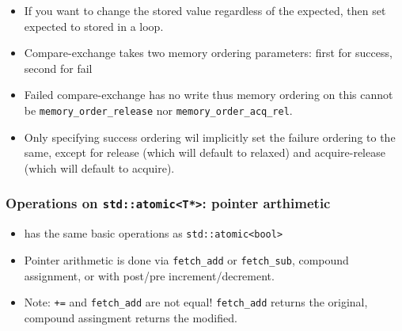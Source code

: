 \documentclass[11pt, a4paper]{article}
\theoremstyle{definition}
\theoremstyle{remark}
\newcommand{\code}[1]{\lstinline|#1|}
\begin{document}
\begin{itemize}
    \item If you want to change the stored value regardless of the expected, then set expected to stored in a loop. 
    \item Compare-exchange takes two memory ordering parameters: first for success, second for fail 
    \item Failed compare-exchange has no write thus memory ordering on this cannot be \code{memory_order_release} nor \code{memory_order_acq_rel}.
    \item Only specifying success ordering wil implicitly set the failure ordering to the same, except for release (which will default to relaxed) and acquire-release (which will default to acquire).
\end{itemize}
\subsubsection{Operations on \texorpdfstring{\code{std::atomic<T*>}}{std::atomic<T*>}: pointer arthimetic}
\begin {itemize}
    \item has the same basic operations as \code{std::atomic<bool>}
    \item Pointer arithmetic is done via \code{fetch_add} or \code{fetch_sub}, compound assignment, or with post/pre increment/decrement.
    \item Note: \code{+=} and \code{fetch_add} are not equal! \code{fetch_add} returns the original, compound assingment returns the modified.
\end {itemize}
\end{document}
